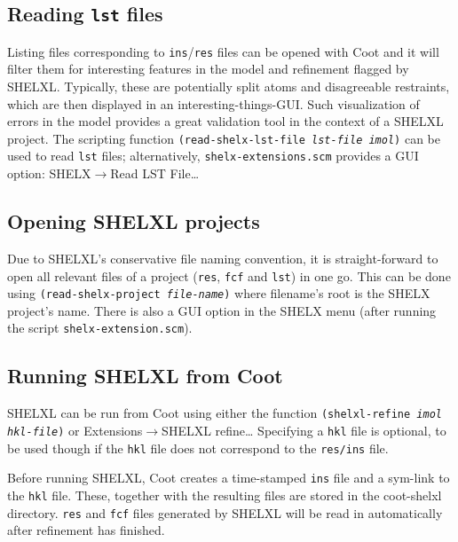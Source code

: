 \documentclass{article}
\begin{document}
\subsection{Reading \texttt{lst} files}
Listing files corresponding to \texttt{ins}/\texttt{res} files can be
opened with Coot and it will filter them for interesting features in
the model and refinement flagged by SHELXL. Typically, these are
potentially split atoms and disagreeable restraints, which are then
displayed in an interesting-things-GUI. Such visualization of errors
in the model provides a great validation tool in the context of a
SHELXL project. The scripting function \texttt{(read-shelx-lst-file
  \emph{lst-file imol})} can be used to read \texttt{lst} files;
alternatively, \texttt{shelx-extensions.scm} provides a GUI option:
\textsf{SHELX$\to$Read LST File\ldots}

\subsection{Opening SHELXL projects} 

Due to SHELXL's conservative file naming convention, it is
straight-forward to open all relevant files of a project
(\texttt{res}, \texttt{fcf} and \texttt{lst}) in one go. This can be
done using \texttt{(read-shelx-project \emph{file-name})} where
filename's root is the SHELX project's name. There is also a GUI
option in the SHELX menu (after running the script
\texttt{shelx-extension.scm}).


\subsection{Running SHELXL from Coot}

SHELXL can be run from Coot using either the function
\texttt{(shelxl-refine \emph{imol hkl-file})} or
\textsf{Extensions$\to$SHELXL refine\ldots} Specifying a \texttt{hkl}
file is optional, to be used though if the \texttt{hkl} file does not
correspond to the \texttt{res/ins} file.

Before running SHELXL, Coot creates a time-stamped \texttt{ins} file
and a sym-link to the \texttt{hkl} file. These, together with the
resulting files are stored in the coot-shelxl directory. \texttt{res}
and \texttt{fcf} files generated by SHELXL will be read in
automatically after refinement has finished.
\end{document}
